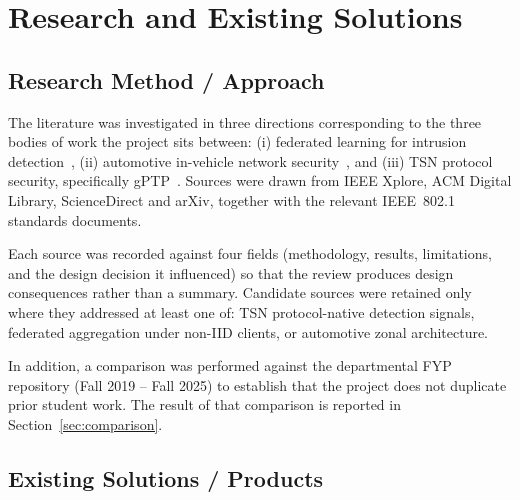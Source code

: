 \chapter{Research and Existing Solutions}
\label{ch:research}

\section{Research Method / Approach}
\label{sec:research-method}
The literature was investigated in three directions corresponding to the three
bodies of work the project sits between: (i) federated learning for intrusion
detection~\cite{adil2026safid,huong2021ics,ruzafa2021privacy,zhang2022transfer,mao2025fedinnid,hu2025sdn,wang2025fedstgcn,altfaily2025graph,adil2026embedded,digregorio2024federated,shahsavari2026sok}, (ii) automotive in-vehicle network security~\cite{park2023zonal,meyer2024framework,meyer2020ingress,meyer2024filtering,appajosyula2024zonal,hackel2022securesdn,sorescu2026ota,zhou2021simulating}, and (iii) TSN protocol
security, specifically gPTP~\cite{luo2021qci,ergenc2023tsnzeek,feng2024robusttsn,bulbul2023preemptive,alnajim2022scheduling,yucel2026icns,samp2026gptp,devos2023frer,fotouhi2023assessing,berardi2023tsn,kakade2022vulnerability}. Sources were drawn from IEEE Xplore, ACM Digital
Library, ScienceDirect and arXiv, together with the relevant IEEE~802.1 standards
documents.

Each source was recorded against four fields (methodology, results, limitations,
and the design decision it influenced) so that the review produces design
consequences rather than a summary. Candidate sources were retained only where they
addressed at least one of: TSN protocol-native detection signals, federated
aggregation under non-IID clients, or automotive zonal architecture.

In addition, a comparison was performed against the departmental FYP repository
(Fall 2019 -- Fall 2025) to establish that the project does not duplicate prior
student work. The result of that comparison is reported in Section~\ref{sec:comparison}.


\section{Existing Solutions / Products}

